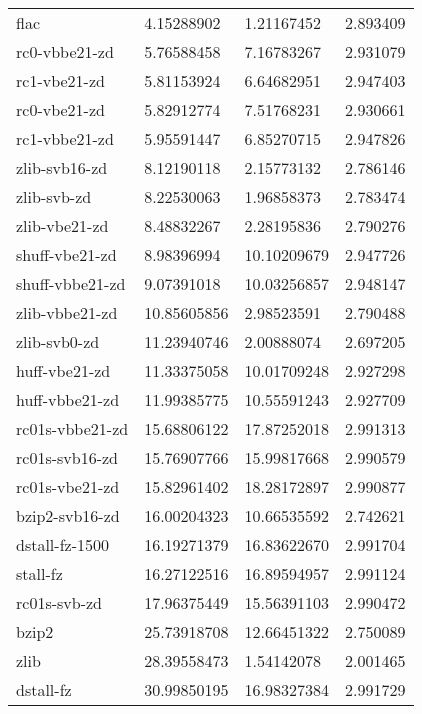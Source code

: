 \begin{table}
\begin{tabular}{|l|l|l|l|}
               flac     & 4.15288902      & 1.21167452    &2.893409\\
		\rowcolor{lightgray}
      rc0-vbbe21-zd     & 5.76588458      & 7.16783267    &2.931079\\
		\rowcolor{lightgray}
       rc1-vbe21-zd     & 5.81153924      & 6.64682951    &2.947403\\
		\rowcolor{lightgray}
       rc0-vbe21-zd     & 5.82912774      & 7.51768231    &2.930661\\
		\rowcolor{lightgray}
      rc1-vbbe21-zd     & 5.95591447      & 6.85270715    &2.947826\\
      zlib-svb16-zd     & 8.12190118      & 2.15773132    &2.786146\\
        zlib-svb-zd     & 8.22530063      & 1.96858373    &2.783474\\
      zlib-vbe21-zd     & 8.48832267      & 2.28195836    &2.790276\\
		\rowcolor{lightgray}
     shuff-vbe21-zd     & 8.98396994      &10.10209679    &2.947726\\
		\rowcolor{lightgray}
    shuff-vbbe21-zd     & 9.07391018      &10.03256857    &2.948147\\
     zlib-vbbe21-zd     &10.85605856      & 2.98523591    &2.790488\\
       zlib-svb0-zd     &11.23940746      & 2.00888074    &2.697205\\
      huff-vbe21-zd     &11.33375058      &10.01709248    &2.927298\\
     huff-vbbe21-zd     &11.99385775      &10.55591243    &2.927709\\
		\rowcolor{lightgray}
    rc01s-vbbe21-zd     &15.68806122      &17.87252018    &2.991313\\
		\rowcolor{lightgray}
     rc01s-svb16-zd     &15.76907766      &15.99817668    &2.990579\\
		\rowcolor{lightgray}
     rc01s-vbe21-zd     &15.82961402      &18.28172897    &2.990877\\
     bzip2-svb16-zd     &16.00204323      &10.66535592    &2.742621\\
		\rowcolor{lightgray}
     dstall-fz-1500     &16.19271379      &16.83622670    &2.991704\\
		\rowcolor{lightgray}
           stall-fz     &16.27122516      &16.89594957    &2.991124\\
		\rowcolor{lightgray}
       rc01s-svb-zd     &17.96375449      &15.56391103    &2.990472\\
              bzip2     &25.73918708      &12.66451322    &2.750089\\
               zlib     &28.39558473      & 1.54142078    &2.001465\\
		\rowcolor{lightgray}
          dstall-fz     &30.99850195      &16.98327384    &2.991729\\
	\hline
    \end{tabular}
\end{table}

